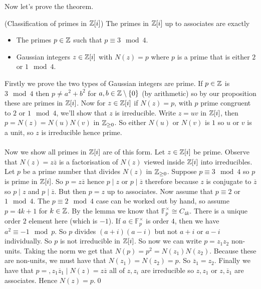 \documentclass{article}
\begin{document}
\begin{itemize}
Now let's prove the theorem.
\begin{theorem}
	(Classification of primes in $ \mathbb{Z}[i] $) The primes in $ \mathbb{Z}[i] $ up to associates are exactly
	\begin{itemize}
		\item The primes $ p\in\mathbb{Z} $ such that $ p\equiv 3 \mod 4 $.
		\item Gaussian integers $ z\in \mathbb{Z}[i] $ with $ N(z)=p $ where $ p $ is a prime that is either $ 2 $ or $ 1 \mod 4$.
	\end{itemize}
\end{theorem}
\pf Firstly we prove the two types of Gaussian integers are prime. If $ p\in \mathbb{Z} $ is $ 3\mod 4 $ then $ p\ne a^2+b^2 $ for $ a,b\in \mathbb{Z}\setminus \{0\} $ (by arithmetic) so by our proposition these are primes in $ \mathbb{Z}[i] $. Now for $ z\in\mathbb{Z}[i] $ if $ N(z)=p $, with $ p $ prime congruent to $ 2 $ or $ 1 \mod 4 $, we'll show that $ z $ is irreducible. Write $ z=uv $ in $ \mathbb{Z}[i] $, then $ p=N(z)=N(u)N(v) $ in $ \mathbb{Z}_{\ge 0 } $. So either $ N(u) $ or $ N(v) $ is $ 1 $ so $ u $ or $ v $ is a unit, so $ z $ is irreducible hence prime.\\\\
Now we show all primes in $ \mathbb{Z}[i] $ are of this form. Let $ z\in \mathbb{Z}[i] $ be prime. Observe that $ N(z)=z\overline z $ is a factorisation of $ N(z) $ viewed inside $ \mathbb{Z}[i] $ into irreducibles. Let $ p $ be a prime number that divides $ N(z) $ in $ \mathbb{Z}_{\ge 0} $. Suppose $ p\equiv 3\mod 4 $ so $ p $ is prime in $ \mathbb{Z}[i] $. So $ p=z\overline z $ hence $ p\mid z $ or $ p\mid \overline z $ therefore because $ z $ is conjugate to $ \overline z $ so $ p\mid z$ and $ p\mid \overline z $. But then $ p=z $ up to associates. Now assume that $ p\equiv 2 $ or $ 1\mod 4 $. The $ p\equiv 2 \mod 4 $ case can be worked out by hand, so assume $ p=4k+1 $ for $ k \in \mathbb{Z} $. By the lemma we know that $ \mathbb F_p^\times \cong C_{4k} $. There is a unique order $ 2 $ element here (which is $ -1 $). If $ a\in \mathbb F_p^\times $ is order $ 4 $, then we have $ a^2\equiv -1\mod p $. So $ p $ divides $ (a+i)(a-i) $ but not $ a+i $ or $ a-i $ individually. So $ p $ is not irreducible in $ \mathbb{Z}[i] $. So now we can write $ p=z_1z_2 $ non-units. Taking the norm we get that $ N(p)=p^2=N(z_1)N(z_2) $. Because these are non-units, we must have that $ N(z_1)=N(z_2)=p $. So $ \overline z_1=z_2 $. Finally we have that $ p= , z_1\overline z_1\mid N(z)=z\overline z $ all of $ z,z_i $ are irreducible so $ z,z_1 $ or $ z,\overline z_1 $ are associates. Hence $ N(z)=p. $\qed
\begin{corollary}

\end{corollary}
\end{itemize}
\end{document}
